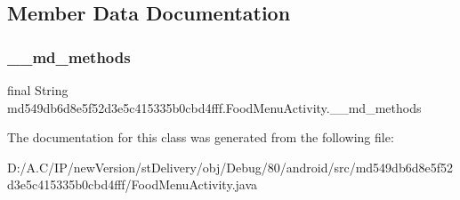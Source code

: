 \subsection{Member Data Documentation}
\mbox{\label{classmd549db6d8e5f52d3e5c415335b0cbd4fff_1_1_food_menu_activity_aaa9d4e3a72d7a27b325921fcb52cc76c}} 
\subsubsection{\texorpdfstring{\+\_\+\+\_\+md\+\_\+methods}{\_\_md\_methods}}
{\footnotesize\ttfamily final String md549db6d8e5f52d3e5c415335b0cbd4fff.\+Food\+Menu\+Activity.\+\_\+\+\_\+md\+\_\+methods\hspace{0.3cm}{\ttfamily [static]}}



The documentation for this class was generated from the following file\+:\begin{DoxyCompactItemize}
\item 
D\+:/\+A.\+C/\+I\+P/new\+Version/st\+Delivery/obj/\+Debug/80/android/src/md549db6d8e5f52d3e5c415335b0cbd4fff/Food\+Menu\+Activity.\+java\end{DoxyCompactItemize}
